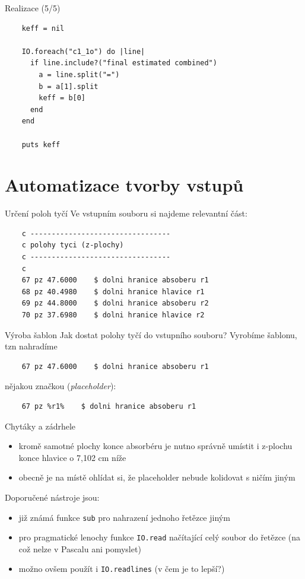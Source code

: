 \documentclass{beamer}
\begin{document}
\begin{frame}[fragile]{Realizace (5/5)}
  \scriptsize
  \begin{verbatim}
    keff = nil

    IO.foreach("c1_1o") do |line|
      if line.include?("final estimated combined")
        a = line.split("=")
        b = a[1].split
        keff = b[0]
      end
    end

    puts keff
  \end{verbatim}
\end{frame}


\section{Automatizace tvorby vstupů}

\begin{frame}[fragile]{Určení poloh tyčí}
  Ve vstupním souboru si najdeme relevantní část:
  \scriptsize
  \begin{verbatim}
    c ---------------------------------
    c polohy tyci (z-plochy)
    c ---------------------------------
    c
    67 pz 47.6000    $ dolni hranice absoberu r1
    68 pz 40.4980    $ dolni hranice hlavice r1
    69 pz 44.8000    $ dolni hranice absoberu r2
    70 pz 37.6980    $ dolni hranice hlavice r2
  \end{verbatim}
\end{frame}

\begin{frame}[fragile]{Výroba šablon}
  Jak dostat polohy tyčí do vstupního souboru? Vyrobíme šablonu, tzn nahradíme
  \begin{verbatim}
    67 pz 47.6000    $ dolni hranice absoberu r1
  \end{verbatim}
  \pause
  nějakou značkou (\emph{placeholder}):
  \begin{verbatim}
    67 pz %r1%    $ dolni hranice absoberu r1
  \end{verbatim}
\end{frame}

\begin{frame}{Chytáky a zádrhele}
  \begin{itemize}
    \item kromě samotné plochy konce absorbéru je nutno správně umístit i z-plochu konce hlavice o 7,102 cm níže
    \item obecně je na místě ohlídat si, že placeholder nebude kolidovat s ničím jiným
  \end{itemize}
  Doporučené nástroje jsou:
  \begin{itemize}
    \item již známá funkce \texttt{sub} pro nahrazení jednoho řetězce jiným
    \item pro pragmatické lenochy funkce \texttt{IO.read} načítající celý soubor do řetězce (na což nelze v Pascalu ani pomyslet)
    \item možno ovšem použít i \texttt{IO.readlines} (v čem je to lepší?)
  \end{itemize}
\end{frame}
\end{document}
